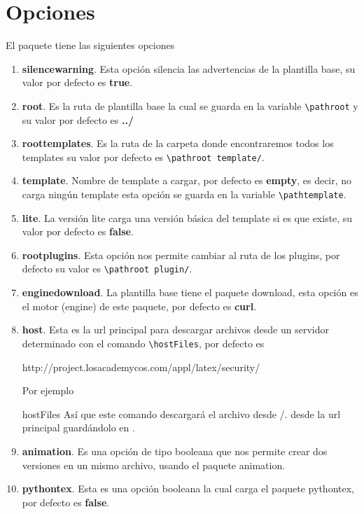 {	\section{Opciones}\label{sec:opciones}
	El paquete \printproject\space tiene las siguientes opciones
	\begin{enumerate}
		\item \textbf{silencewarning}. Esta opción silencia las advertencias de la plantilla base, su valor por defecto es \textbf{true}.
		\item \textbf{root}. Es la ruta de plantilla base la cual se guarda en la variable \verb|\pathroot| y su valor por defecto es \textbf{../}
		\item \textbf{roottemplates}. Es la ruta de la carpeta donde encontraremos todos los templates su valor por defecto es \verb|\pathroot template/|.
		\item \textbf{template}. Nombre de template a cargar, por defecto es \textbf{empty}, es decir, no carga ningún template  esta opción se guarda en la variable \verb|\pathtemplate|.
		\item \textbf{lite}. La versión lite carga una versión básica del template si es que existe, su valor por defecto es \textbf{false}.
		\item \textbf{rootplugins}. Esta opción nos permite cambiar al ruta de los plugins, por defecto su valor es \verb|\pathroot plugin/|.
		\item \textbf{enginedownload}. La plantilla base tiene el paquete download, esta opción es el motor (engine) de este paquete, por defecto es \textbf{curl}.
		\item \textbf{host}. Esta es la url principal para descargar archivos desde un servidor determinado con el comando \verb|\hostFiles|, por defecto es
		\begin{center}
			http://project.losacademycos.com/appl/latex/security/
		\end{center}
		Por ejemplo 
		\begin{docCommand}{hostFiles}{}
			Así que este comando descargará el archivo desde /. desde la url principal guardándolo en .
		\end{docCommand}
		\item \textbf{animation}. Es una opción de tipo booleana que nos permite crear dos versiones en un mismo archivo, usando el paquete animation.
		\item \textbf{pythontex}. Esta es una opción booleana la cual carga el paquete pythontex, por defecto es \textbf{false}.

\end{enumerate}}
